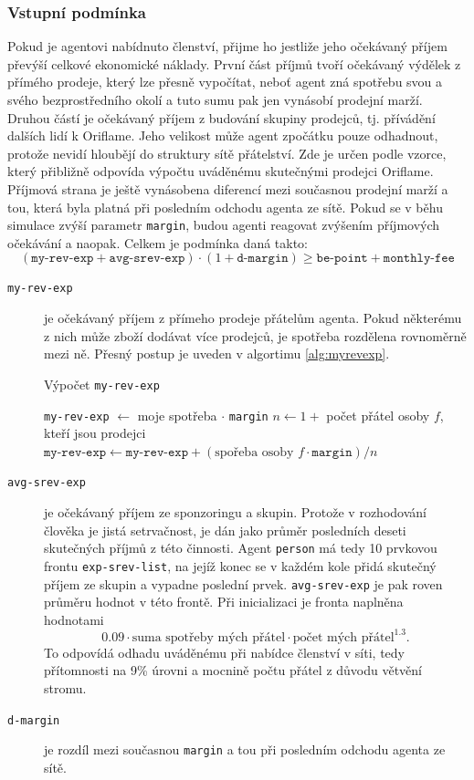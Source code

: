 \documentclass[a4wide,12pt]{report}
\begin{document}
\subsubsection{Vstupní podmínka}
Pokud je agentovi nabídnuto členství, přijme ho jestliže jeho očekávaný příjem převýší celkové ekonomické náklady. První část příjmů tvoří očekávaný výdělek z přímého prodeje, který lze přesně vypočítat, neboť agent zná spotřebu svou a svého bezprostředního okolí a tuto sumu pak jen vynásobí prodejní marží. Druhou částí je očekávaný příjem z budování skupiny prodejců, tj. přívádění dalších lidí k Oriflame. Jeho velikost může agent zpočátku pouze odhadnout, protože nevidí hloubějí do struktury sítě přátelství. Zde je určen podle vzorce, který přibližně odpovída výpočtu uváděnému skutečnými prodejci Oriflame. Příjmová strana je ještě vynásobena diferencí mezi současnou prodejní marží a tou, která byla platná při posledním odchodu agenta ze sítě. Pokud se v běhu simulace zvýší parametr \texttt{margin}, budou agenti reagovat zvýšením příjmových očekávání a naopak. Celkem je podmínka daná takto:
\[(\texttt{my-rev-exp} + \texttt{avg-srev-exp}) \cdot (1+\texttt{d-margin}) \geq \texttt{be-point} + \texttt{monthly-fee}\]
\begin{description}
\item[\texttt{my-rev-exp}] je očekávaný příjem z přímeho prodeje přátelům agenta. Pokud některému z nich může zboží dodávat více prodejců, je spotřeba rozdělena rovnoměrně mezi ně. Přesný postup je uveden v algortimu \ref{alg:myrevexp}.
\begin{algorithm}
\caption{Výpočet \texttt{my-rev-exp}}
\label{alg:myrevexp}
\begin{algorithmic}[]
\STATE \texttt{my-rev-exp} $\gets$ moje spotřeba $\cdot$ \texttt{margin}
  \STATE $n\gets 1 + $ počet přátel osoby $f$, kteří jsou prodejci
  \STATE $\texttt{my-rev-exp}\gets\texttt{my-rev-exp}+(\text{spořeba osoby }f \cdot \texttt{margin}) / n$
\ENDFOR
\end{algorithmic}
\end{algorithm}
\item[\texttt{avg-srev-exp}] je očekávaný příjem ze sponzoringu a skupin. Protože v rozhodování člověka je jistá setrvačnost, je dán jako průměr posledních deseti skutečných příjmů z této činnosti. Agent \texttt{person} má tedy 10 prvkovou frontu \texttt{exp-srev-list}, na jejíž konec se v každém kole přidá skutečný příjem ze skupin a vypadne poslední prvek. \texttt{avg-srev-exp} je pak roven průměru hodnot v této frontě. Při inicializaci je fronta naplněna hodnotami
\[ 0.09\cdot \text{suma spotřeby mých přátel}\cdot \text{počet mých přátel}^{1.3}.\]
To odpovídá odhadu uváděnému při nabídce členství v síti, tedy přítomnosti na 9\% úrovni a mocnině počtu přátel z důvodu větvění stromu.
\item[\texttt{d-margin}] je rozdíl mezi současnou \texttt{margin} a tou při posledním odchodu agenta ze sítě.
\end{description}
\end{document}
